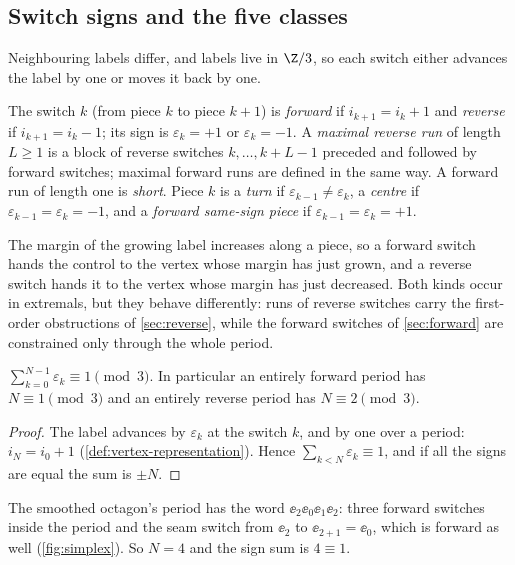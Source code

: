 \subsection{Switch signs and the five classes}\label{sec:per-classes}

Neighbouring labels differ, and labels live in $\Z/3$, so each switch either advances the label
by one or moves it back by one.

\begin{definition}\label{def:signs}
The switch $k$ (from piece $k$ to piece $k+1$) is \emph{forward} if $i_{k+1}=i_k+1$ and
\emph{reverse} if $i_{k+1}=i_k-1$; its sign is $\varepsilon_k=+1$ or $\varepsilon_k=-1$. A \emph{maximal reverse
run} of length $L\ge1$ is a block of reverse switches $k,\dots,k+L-1$ preceded and followed by
forward switches; maximal forward runs are defined in the same way. A forward run of length one
is \emph{short}. Piece $k$ is a \emph{turn} if $\varepsilon_{k-1}\ne\varepsilon_k$, a \emph{centre} if
$\varepsilon_{k-1}=\varepsilon_k=-1$, and a \emph{forward same-sign piece} if $\varepsilon_{k-1}=\varepsilon_k=+1$.
\end{definition}

The margin of the growing label increases along a piece, so a forward switch hands the control
to the vertex whose margin has just grown, and a reverse switch hands it to the vertex whose
margin has just decreased. Both kinds occur in extremals, but they behave differently: runs of
reverse switches carry the first-order obstructions of \cref{sec:reverse}, while the forward
switches of \cref{sec:forward} are constrained only through the whole period.

\begin{lemma}\label{lem:sign-sum}
$\sum_{k=0}^{N-1}\varepsilon_k\equiv1\pmod 3$. In particular an entirely forward period has
$N\equiv1\pmod3$ and an entirely reverse period has $N\equiv2\pmod3$.
\end{lemma}

\begin{proof}
The label advances by $\varepsilon_k$ at the switch $k$, and by one over a period:
$i_N=i_0+1$ (\cref{def:vertex-representation}). Hence $\sum_{k<N}\varepsilon_k\equiv1$, and if
all the signs are equal the sum is $\pm N$.
\end{proof}

The smoothed octagon's period has the word $\ee_2\ee_0\ee_1\ee_2$: three forward switches inside
the period and the seam switch from $\ee_2$ to $\ee_{2+1}=\ee_0$, which is forward as well
(\cref{fig:simplex}). So $N=4$ and the sign sum is $4\equiv1$.

